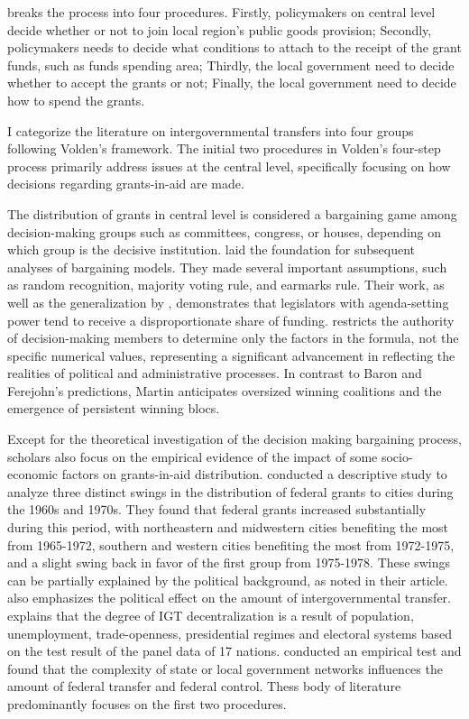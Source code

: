 \documentclass[man]{apa7}
\begin{document}
\Textcite{volden2005intergovernmental}breaks the process into four procedures. Firstly, policymakers on central level decide whether or not to join local region's public goods provision; Secondly, policymakers needs to decide what conditions to attach to the receipt of the grant funds, such as funds spending area; Thirdly, the local government need to decide whether to accept the grants or not; Finally, the local government need to decide how to spend the grants.

I categorize the literature on intergovernmental transfers into four groups following Volden's framework. The initial two procedures in Volden's four-step process primarily address issues at the central level, specifically focusing on how decisions regarding grants-in-aid are made.

The distribution of grants in central level is considered a bargaining game among decision-making groups such as committees, congress, or houses, depending on which group is the decisive institution. \Textcite{baron1989bargaining} laid the foundation for subsequent analyses of bargaining models. They made several important assumptions, such as random recognition, majority voting rule, and earmarks rule. Their work, as well as the generalization by \Textcite{banks2006general}, demonstrates that legislators with agenda-setting power tend to receive a disproportionate share of funding. \Textcite{martin2018dividing} restricts the authority of decision-making members to determine only the factors in the formula, not the specific numerical values, representing a significant advancement in reflecting the realities of political and administrative processes. In contrast to Baron and Ferejohn's predictions, Martin anticipates oversized winning coalitions and the emergence of persistent winning blocs.

Except for the theoretical investigation of the decision making bargaining process, scholars also focus on the empirical evidence of the impact of some socio-economic factors on grants-in-aid distribution. \Textcite{markusen1981benefits} conducted a descriptive study to analyze three distinct swings in the distribution of federal grants to cities during the 1960s and 1970s. They found that federal grants increased substantially during this period, with northeastern and midwestern cities benefiting the most from 1965-1972, southern and western cities benefiting the most from 1972-1975, and a slight swing back in favor of the first group from 1975-1978. These swings can be partially explained by the political background, as noted in their article. \Textcite{wallis1987employment} also emphasizes the political effect on the amount of intergovernmental transfer. \Textcite{stegarescu2006decentralised} explains that the degree of IGT decentralization is a result of population, unemployment, trade-openness, presidential regimes and electoral systems based on the test result of the panel data of 17 nations. \Textcite{kasdin2016decision} conducted an empirical test and found that the complexity of state or local government networks influences the amount of federal transfer and federal control. Thess body of literature predominantly focuses on the first two procedures.
\end{document}
